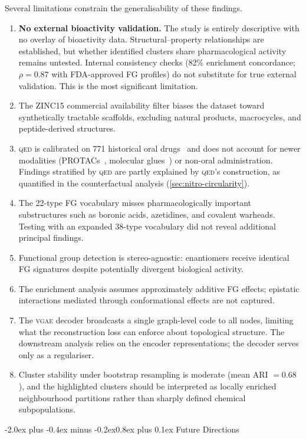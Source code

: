 \documentclass[10pt,a4paper,twocolumn]{article}
\makeatletter
\providecommand{\qed}{}
\let\qed\relax
\newcommand{\vgae}{\textsc{vgae}}
\newcommand{\qedscore}{\textsc{qed}}
\let\qed\qedscore
\renewcommand\subsection{\@startsection{subsection}{2}{\z@}%
  {-2.0ex plus -0.4ex minus -0.2ex}{0.8ex plus 0.1ex}%
  {\normalfont\large\bfseries}}
\makeatother
\begin{document}
Several limitations constrain the generalisability of these findings.
\begin{enumerate}[label=(\roman*)]
  \item \textbf{No external bioactivity validation.} The study is entirely descriptive with no overlay of bioactivity data. Structural--property relationships are established, but whether identified clusters share pharmacological activity remains untested. Internal consistency checks (82\% enrichment concordance; $\rho = 0.87$ with FDA-approved FG profiles) do not substitute for true external validation. This is the most significant limitation.
  \item The ZINC15 commercial availability filter biases the dataset toward synthetically tractable scaffolds, excluding natural products, macrocycles, and peptide-derived structures.
  \item \qed{} is calibrated on 771 historical oral drugs~\cite{bickerton2012} and does not account for newer modalities (PROTACs~\cite{sakamoto2001}, molecular glues~\cite{sasso2023}) or non-oral administration. Findings stratified by \qed{} are partly explained by \qed{}'s construction, as quantified in the counterfactual analysis (\cref{sec:nitro-circularity}).
  \item The 22-type FG vocabulary misses pharmacologically important substructures such as boronic acids, azetidines, and covalent warheads. Testing with an expanded 38-type vocabulary did not reveal additional principal findings.
  \item Functional group detection is stereo-agnostic: enantiomers receive identical FG signatures despite potentially divergent biological activity.
  \item The enrichment analysis assumes approximately additive FG effects; epistatic interactions mediated through conformational effects are not captured.
  \item The \vgae{} decoder broadcasts a single graph-level code to all nodes, limiting what the reconstruction loss can enforce about topological structure. The downstream analysis relies on the encoder representations; the decoder serves only as a regulariser.
  \item Cluster stability under bootstrap resampling is moderate (mean ARI $= 0.68$), and the highlighted clusters should be interpreted as locally enriched neighbourhood partitions rather than sharply defined chemical subpopulations.
\end{enumerate}

\subsection{Future Directions}
\end{document}
